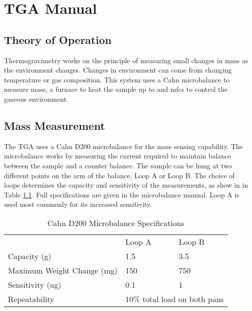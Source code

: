 

\chapter{TGA Manual}
\label{app:TGA}
\section{Theory of Operation}
Thermogravimetry works on the principle of measuring small changes in mass as the environment changes.
Changes in environment can come from changing temperature or gas composition.
This system uses a Cahn microbalance to measure mass, a furnace to heat the sample up to  and \glspl{mfc} to control the gaseous environment.

\section{Mass Measurement}
    The TGA uses a Cahn D200 microbalance for the mass sensing capability.
    The microbalance works by measuring the current required to maintain balance between the sample and a counter balance.
    The sample can be hung at two different points on the arm of the balance, Loop A or Loop B.
    The choice of loops determines the capacity and sensitivity of the measurements, as show in in Table \ref{tab:tga}.
    Full specifications are given in the microbalance manual.
    Loop A is used most commonly for its increased sensitivity.

    \begin{table}
    \centering
    \caption{Cahn D200 Microbalance Specifications}
    \label{tab:tga}
    \begin{tabular}{lll}
                               & Loop A & Loop B                                   \\
    \cline{2-3}
    Capacity (g)               & 1.5    & 3.5                                      \\
    Maximum Weight Change (mg) & 150    & 750                                      \\
    Sensitivity (ug)           & 0.1    & 1                                        \\
    Repeatability              & \multicolumn{2}{l}{10\% total load on both pans}
    \end{tabular}
    \end{table}

